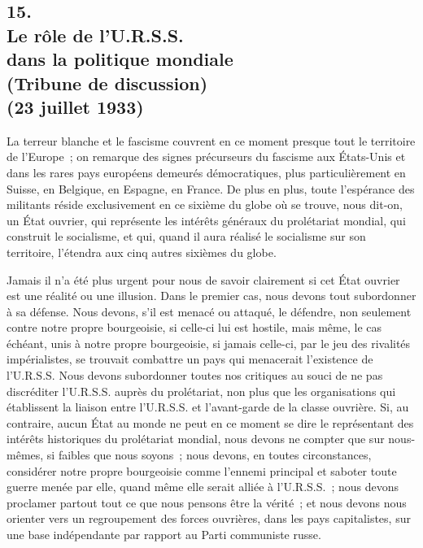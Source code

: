 \documentclass[french,twoside]{book} %
\begin{document}
\subsection[15. Le rôle de l’U.R.S.S. dans la politique mondiale, (Tribune de discussion) (23 juillet 1933)]{15. \\
Le rôle de l’U.R.S.S. \\
dans la politique mondiale \\
(Tribune de discussion) \\
(23 juillet 1933)}
\noindent \par
La terreur blanche et le fascisme couvrent en ce moment presque tout le territoire de l'Europe ; on remarque des signes précurseurs du fascisme aux États-Unis et dans les rares pays européens demeurés démocratiques, plus particulièrement en Suisse, en Belgique, en Espagne, en France. De plus en plus, toute l'espérance des militants réside exclusivement en ce sixième du globe où se trouve, nous dit-on, un État ouvrier, qui représente les intérêts généraux du prolétariat mondial, qui construit le socialisme, et qui, quand il aura réalisé le socialisme sur son territoire, l'étendra aux cinq autres sixièmes du globe.\par
Jamais il n'a été plus urgent pour nous de savoir clairement si cet État ouvrier est une réalité ou une illusion. Dans le premier cas, nous devons tout subordonner à sa défense. Nous devons, s'il est menacé ou attaqué, le défen­dre, non seulement contre notre propre bourgeoisie, si celle-ci lui est hostile, mais même, le cas échéant, unis à notre propre bourgeoisie, si jamais celle-ci, par le jeu des rivalités impérialistes, se trouvait combattre un pays qui mena­cerait l'existence de l'U.R.S.S. Nous devons subordonner toutes nos critiques au souci de ne pas discréditer l'U.R.S.S. auprès du prolétariat, non plus que les organisations qui établissent la liaison entre l'U.R.S.S. et l'avant-garde de la classe ouvrière. Si, au contraire, aucun État au monde ne peut en ce moment se dire le représentant des intérêts historiques du prolétariat mondial, nous devons ne compter que sur nous-mêmes, si faibles que nous soyons ; nous devons, en toutes circonstances, considérer notre propre bourgeoisie comme l'ennemi principal et saboter toute guerre menée par elle, quand même elle serait alliée à l'U.R.S.S. ; nous devons proclamer partout tout ce que nous pensons être la vérité ; et nous devons nous orienter vers un regroupement des forces ouvrières, dans les pays capitalistes, sur une base indépendante par rapport au Parti communiste russe.\par
\end{document}
